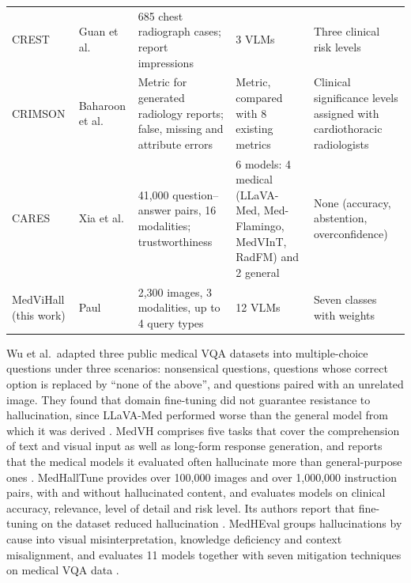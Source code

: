 \documentclass[11pt,a4paper]{article}
\providecommand{\Nimages}{2{,}300}
\providecommand{\Nmodels}{12}
\begin{document}
\begin{table}[tbp]
\begin{tabular}{@{}p{2.2cm}p{2.6cm}p{4.2cm}p{2.9cm}p{2.5cm}@{}}
CREST \citep{crest2025medrxiv} & Guan et al. & 685 chest radiograph cases; report impressions & 3 VLMs & Three clinical risk levels \\
CRIMSON \citep{baharoon2026crimson} & Baharoon et al. & Metric for generated radiology reports; false, missing and attribute errors & Metric, compared with 8 existing metrics & Clinical significance levels assigned with cardiothoracic radiologists \\
CARES \citep{xia2024cares} & Xia et al. & 41,000 question--answer pairs, 16 modalities; trustworthiness & 6 models: 4 medical (LLaVA-Med, Med-Flamingo, MedVInT, RadFM) and 2 general & None (accuracy, abstention, overconfidence) \\
\midrule
MedViHall (this work) & Paul & \Nimages{} images, 3 modalities, up to 4 query types & \Nmodels{} VLMs & Seven classes with weights \\
\bottomrule
\end{tabular}
\end{table}
Wu et al.\ adapted three public medical VQA datasets into multiple-choice questions under three scenarios: nonsensical questions, questions whose correct option is replaced by ``none of the above'', and questions paired with an unrelated image. They found that domain fine-tuning did not guarantee resistance to hallucination, since LLaVA-Med performed worse than the general model from which it was derived \citep{wu2024halluvqa}. MedVH comprises five tasks that cover the comprehension of text and visual input as well as long-form response generation, and reports that the medical models it evaluated often hallucinate more than general-purpose ones \citep{gu2024medvh}. MedHallTune provides over 100,000 images and over 1,000,000 instruction pairs, with and without hallucinated content, and evaluates models on clinical accuracy, relevance, level of detail and risk level. Its authors report that fine-tuning on the dataset reduced hallucination \citep{yan2025medhalltune}. MedHEval groups hallucinations by cause into visual misinterpretation, knowledge deficiency and context misalignment, and evaluates 11 models together with seven mitigation techniques on medical VQA data \citep{chang2025medheval}.
\end{document}
